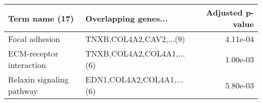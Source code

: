 \begin{tabular}{llr}
\toprule
           Term name (17) &      Overlapping genes... &  Adjusted p-value \\
\midrule
           Focal adhesion &   TNXB,COL4A2,CAV2,...(9) &          4.11e-04 \\
 ECM-receptor interaction & TNXB,COL4A2,COL4A1,...(6) &          1.00e-03 \\
Relaxin signaling pathway & EDN1,COL4A2,COL4A1,...(6) &          5.80e-03 \\
\bottomrule
\end{tabular}
